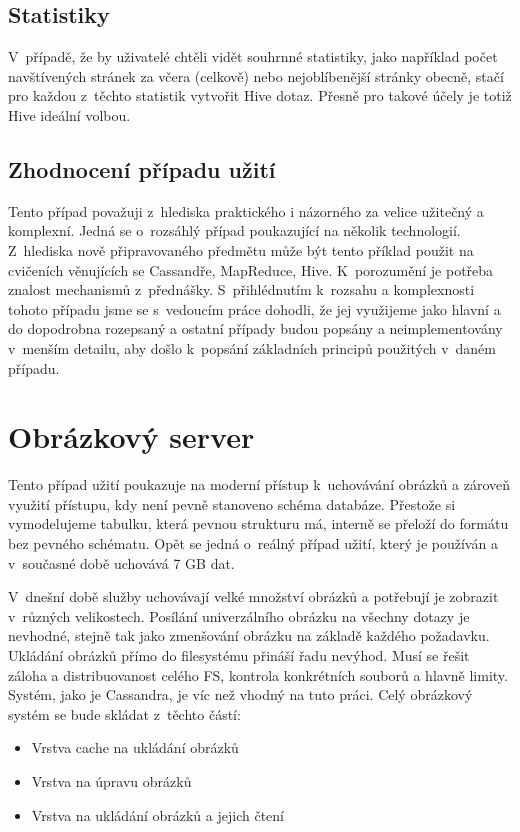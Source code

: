 \subsection{Statistiky}
V~případě, že by uživatelé chtěli vidět souhrnné statistiky, jako například počet navštívených stránek za včera (celkově) nebo nejoblíbenější stránky obecně, stačí pro každou z~těchto statistik vytvořit Hive dotaz. Přesně pro takové účely je totiž Hive ideální volbou.

\subsection{Zhodnocení případu užití}
Tento případ považuji z~hlediska praktického i názorného za velice užitečný a komplexní. Jedná se o~rozsáhlý případ poukazující na několik technologií. Z~hlediska nově připravovaného předmětu může být tento příklad použit na cvičeních věnujících se Cassandře, MapReduce, Hive. K~porozumění je potřeba znalost mechanismů z~přednášky. S~přihlédnutím k~rozsahu a komplexnosti tohoto případu jsme se s~vedoucím práce dohodli, že jej využijeme jako hlavní a do dopodrobna rozepsaný a ostatní případy budou popsány a neimplementovány v~menším detailu, aby došlo k~popsání základních principů použitých v~daném případu. 


\section{Obrázkový server}
Tento případ užití poukazuje na moderní přístup k~uchovávání obrázků a zároveň využití přístupu, kdy není pevně stanoveno schéma databáze. Přestože si vymodelujeme tabulku, která pevnou strukturu má, interně se přeloží do formátu bez pevného schématu. Opět se jedná o~reálný případ užití, který je používán a v~současné době uchovává 7 GB dat. 

V~dnešní době služby uchovávají velké množství obrázků a potřebují je zobrazit v~různých velikostech. Posílání univerzálního obrázku na všechny dotazy je nevhodné, stejně tak jako zmenšování obrázku na základě každého požadavku. Ukládání obrázků přímo do filesystému přináší řadu nevýhod. Musí se řešit záloha a distribuovanost celého FS, kontrola konkrétních souborů a hlavně limity. Systém, jako je Cassandra, je víc než vhodný na tuto práci. Celý obrázkový systém se bude skládat z~těchto částí:

\begin{itemize}
\item Vrstva cache na ukládání obrázků
\item Vrstva na úpravu obrázků 
\item Vrstva na ukládání obrázků a jejich čtení
\end{itemize} 


